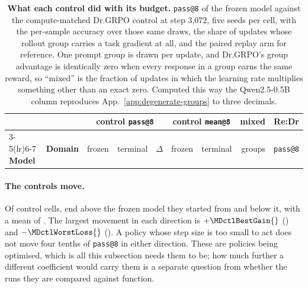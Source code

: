 \documentclass{article}
\newcommand{\1}{\mathbf 1}
\theoremstyle{remark}
\theoremstyle{definition}
\theoremstyle{plain}
\begin{document}
\begin{table}[t]
  \centering
  \caption{\textbf{What each control did with its budget.} \texttt{pass@8} of
  the frozen model against the compute-matched Dr.GRPO control at step 3,072,
  five seeds per cell, with the per-sample accuracy over those same draws, the
  share of updates whose rollout group carries a task gradient at all, and the
  paired replay arm for reference. One prompt
  group is drawn per update, and Dr.GRPO's group advantage is identically zero
  when every response in a group earns the same reward, so ``mixed'' is the
  fraction of updates in which the learning rate multiplies something other
  than an exact zero. Computed this way the Qwen2.5-0.5B column reproduces
  App.~\ref{app:degenerate-groups} to three decimals.}
  \label{tab:control-learning-audit}
  \small
  \setlength{\tabcolsep}{5pt}
  \begin{tabular}{@{}llrrrrrrr@{}}
    \toprule
    & & \multicolumn{3}{c}{\textbf{control \texttt{pass@8}}}
      & \multicolumn{2}{c}{\textbf{control \texttt{mean@8}}}
      & \textbf{mixed} & \textbf{Re:Dr} \\
    \cmidrule(lr){3-5}\cmidrule(lr){6-7}
    \textbf{Model} & \textbf{Domain} & frozen & terminal & $\Delta$
      & frozen & terminal & groups & \texttt{pass@8} \\
    \midrule
    
  \end{tabular}
\end{table}

\paragraph{The controls move.}
Of \MDctlCells{} control cells, \MDctlGains{} end above the frozen model they
started from and \MDctlLosses{} below it, with a mean of \MDctlMeanDelta{}. The
largest movement in each direction is $+\MDctlBestGain{}$
(\MDctlBestGainCell{}) and $-\MDctlWorstLoss{}$ (\MDctlWorstLossCell{}). A
policy whose step size is too small to act does not move four tenths of
\texttt{pass@8} in either direction. These are policies being optimised, which
is all this subsection needs them to be; how much further a different
coefficient would carry them is a separate question from whether the runs
they are compared against function.
\end{document}
